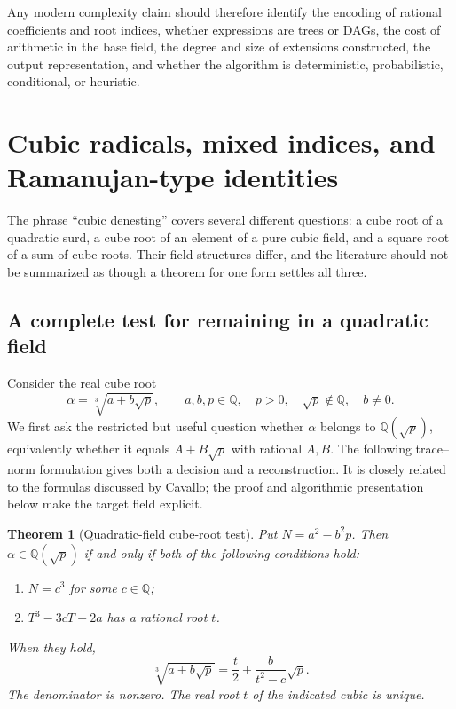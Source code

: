 \documentclass[11pt,a4paper]{article}
\newcommand{\Q}{\mathbb{Q}}
\newcommand{\cbrt}[1]{\sqrt[3]{#1}}
\newtheorem{theorem}{Theorem}[section]
\theoremstyle{definition}
\theoremstyle{remark}
\numberwithin{equation}{section}
\begin{document}
Any modern complexity claim should therefore identify the encoding of rational coefficients and root indices, whether expressions are trees or DAGs, the cost of arithmetic in the base field, the degree and size of extensions constructed, the output representation, and whether the algorithm is deterministic, probabilistic, conditional, or heuristic.

\section{Cubic radicals, mixed indices, and Ramanujan-type identities}
\label{sec:cubics}

The phrase ``cubic denesting'' covers several different questions: a cube root of a quadratic surd, a cube root of an element of a pure cubic field, and a square root of a sum of cube roots. Their field structures differ, and the literature should not be summarized as though a theorem for one form settles all three.

\subsection{A complete test for remaining in a quadratic field}

Consider the real cube root
\[
 \alpha=\cbrt{a+b\sqrt p},\qquad a,b,p\in\Q,
 \quad p>0,\quad \sqrt p\notin\Q,\quad b\ne0.
\]
We first ask the restricted but useful question whether $\alpha$ belongs to $\Q(\sqrt p)$, equivalently whether it equals $A+B\sqrt p$ with rational $A,B$. The following trace--norm formulation gives both a decision and a reconstruction. It is closely related to the formulas discussed by Cavallo; the proof and algorithmic presentation below make the target field explicit.\cite{cavallo}

\begin{theorem}[Quadratic-field cube-root test]
\label{thm:cubictest}
Put $N=a^2-b^2p$. Then $\alpha\in\Q(\sqrt p)$ if and only if both of the following conditions hold:
\begin{enumerate}
\item $N=c^3$ for some $c\in\Q$;
\item $T^3-3cT-2a$ has a rational root $t$.
\end{enumerate}
When they hold,
\begin{equation}\label{eq:cubicreconstruction}
 \cbrt{a+b\sqrt p}=\frac t2+\frac{b}{t^2-c}\sqrt p.
\end{equation}
The denominator is nonzero. The real root $t$ of the indicated cubic is unique.
\end{theorem}
\end{document}
